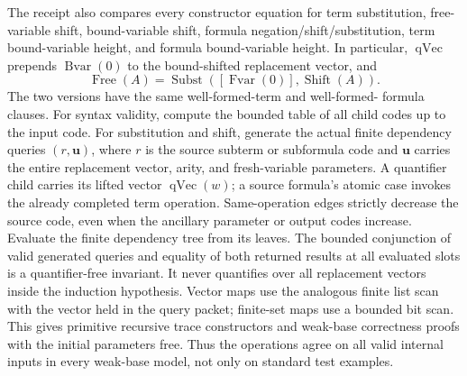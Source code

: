 The receipt also compares every constructor equation for term
substitution, free-variable shift, bound-variable shift, formula
negation/shift/substitution, term bound-variable height, and formula
bound-variable height.  In particular, $\operatorname{qVec}$
prepends $\operatorname{Bvar}(0)$ to the bound-shifted replacement
vector, and
\[
 \operatorname{Free}(A)=
 \operatorname{Subst}([\operatorname{Fvar}(0)],
                         \operatorname{Shift}(A)).
\]
The two versions have the same well-formed-term and well-formed-
formula clauses.  For syntax validity, compute the bounded table
of all child codes up to the input code.  For substitution and
shift, generate the actual finite dependency queries
$(r,\mathbf u)$, where $r$ is the source subterm or subformula
code and $\mathbf u$ carries the entire replacement vector,
arity, and fresh-variable parameters.  A quantifier child carries
its lifted vector $\operatorname{qVec}(w)$; a source formula's
atomic case invokes the already completed term operation.
Same-operation edges strictly decrease the source code, even when
the ancillary parameter or output codes increase.  Evaluate the
finite dependency tree from its leaves.  The bounded conjunction
of valid generated queries and equality of both returned results
at all evaluated slots is a quantifier-free invariant.  It never
quantifies over all replacement vectors inside the induction
hypothesis.  Vector maps use the analogous finite list scan with
the vector held in the query packet; finite-set maps use a bounded
bit scan.  This gives primitive recursive trace constructors and
weak-base correctness proofs with the initial parameters free.
Thus the operations agree on all valid internal inputs in every
weak-base model, not only on standard test examples.


